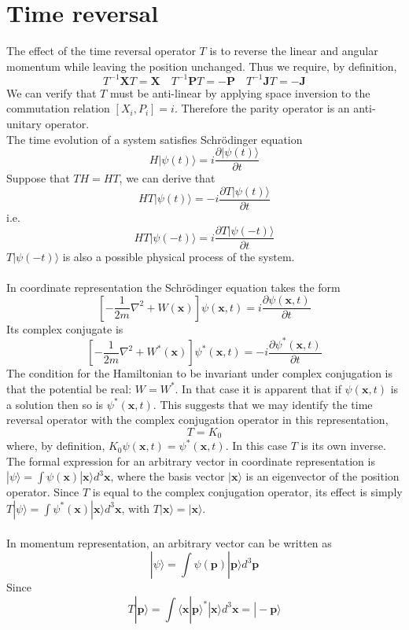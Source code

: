 \section{Time reversal}
The effect of the time reversal operator $T$ is to reverse the linear and angular momentum while leaving the position unchanged. Thus we require, by definition,
\[T^{-1}\bm{X}T = \bm{X} \quad T^{-1}\bm{P}T = -\bm{P} \quad T^{-1}\bm{J}T = -\bm{J}\]
We can verify that $T$ must be anti-linear by applying space inversion to the commutation relation $[X_i,P_i] = i$. Therefore the parity operator is an anti-unitary operator.\\
The time evolution of a system satisfies Schrödinger equation
\[H|\psi(t)\rangle = i\frac{\partial |\psi(t)\rangle }{\partial t}\]
Suppose that $TH=HT$, we can derive that
\[HT|\psi(t)\rangle = -i\frac{\partial T|\psi(t)\rangle }{\partial t}\]
i.e.
\[HT|\psi(-t)\rangle = i\frac{\partial T|\psi(-t)\rangle }{\partial t}\]
$T|\psi(-t)\rangle$ is also a possible physical process of the system.\\ \\
In coordinate representation the Schrödinger equation takes the form
\[ \left[ -\frac{1}{2m}\nabla^2 + W(\bm{x}) \right] \psi(\bm{x},t) = i\frac{\partial \psi(\bm{x},t)}{\partial t}\]
Its complex conjugate is
\[ \left[ -\frac{1}{2m}\nabla^2 + W^*(\bm{x}) \right] \psi^*(\bm{x},t) = -i\frac{\partial \psi^*(\bm{x},t)}{\partial t}\]
The condition for the Hamiltonian to be invariant under complex conjugation is that the potential be real: $W=W^*$. In that case it is apparent that if $\psi(\bm{x},t)$ is a solution then so is  $\psi^*(\bm{x},t)$. This suggests that we may identify the time reversal operator with the complex conjugation operator in this representation,
\[T = K_0\]
where, by definition, $K_0\psi(\bm{x},t) = \psi^*(\bm{x},t)$. In this case $T$ is its own inverse. 
The formal expression for an arbitrary vector in coordinate representation is $|\psi\rangle = \int \psi(\bm{x})|\bm{x}\rangle d^3 \bm{x}$, where the basis vector $|\bm{x}\rangle$ is an eigenvector of the position operator. Since $T$ is equal to the complex conjugation operator, its effect is simply $T|\psi\rangle = \int \psi^*(\bm{x})|\bm{x}\rangle d^3 \bm{x}$, with $T|\bm{x}\rangle = |\bm{x}\rangle$.\\ \\
In momentum representation, an arbitrary vector can be written as
\[|\psi\rangle = \int \psi(\bm{p})|\bm{p}\rangle d^3 \bm{p}\]
Since
\[T|\bm{p}\rangle = \int \langle \bm{x} | \bm{p}\rangle^* |
\bm{x}\rangle d^3 \bm{x} = |-\bm{p}\rangle\]

